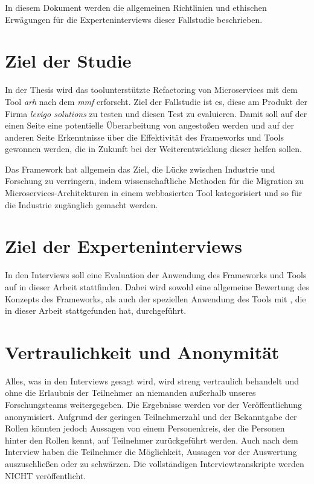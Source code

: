 In diesem Dokument werden die allgemeinen Richtlinien und ethischen Erwägungen für die Experteninterviews dieser Fallstudie beschrieben.

\section{Ziel der Studie}

In der Thesis wird das toolunterstützte Refactoring von Microservices mit dem Tool \emph{\acrlong{arh}} nach dem \emph{\acrlong{mmf}} erforscht.
Ziel der Fallstudie ist es, diese am Produkt \jf der Firma \emph{levigo solutions} zu testen und diesen Test zu evaluieren.
Damit soll auf der einen Seite eine potentielle Überarbeitung von \jf angestoßen werden und auf der anderen Seite Erkenntnisse über die Effektivität des Frameworks und Tools gewonnen werden, die in Zukunft bei der Weiterentwicklung dieser helfen sollen.

Das Framework hat allgemein das Ziel, die Lücke zwischen Industrie und Forschung zu verringern, indem wissenschaftliche Methoden für die Migration zu Microservices-Architekturen in einem webbasierten Tool kategorisiert und so für die Industrie zugänglich gemacht werden.

\section{Ziel der Experteninterviews}

In den Interviews soll eine Evaluation der Anwendung des Frameworks und Tools auf \jf in dieser Arbeit stattfinden.
Dabei wird sowohl eine allgemeine Bewertung des Konzepts des Frameworks, als auch der speziellen Anwendung des Tools mit \jf, die in dieser Arbeit stattgefunden hat, durchgeführt.

\section{Vertraulichkeit und Anonymität}
Alles, was in den Interviews gesagt wird, wird streng vertraulich behandelt und ohne die Erlaubnis der Teilnehmer an niemanden außerhalb unseres Forschungsteams weitergegeben.
Die Ergebnisse werden vor der Veröffentlichung anonymisiert.
Aufgrund der geringen Teilnehmerzahl und der Bekanntgabe der Rollen könnten jedoch Aussagen von einem Personenkreis, der die Personen hinter den Rollen kennt, auf Teilnehmer zurückgeführt werden.
Auch nach dem Interview haben die Teilnehmer die Möglichkeit, Aussagen vor der Auswertung auszuschließen oder zu schwärzen.
Die vollständigen Interviewtranskripte werden NICHT veröffentlicht.

